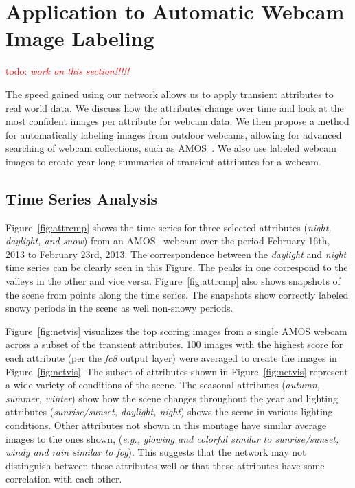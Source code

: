 \documentclass[10pt,twocolumn,letterpaper]{article}
\newcommand{\todo}[1]{\textcolor{red}{todo: {\em #1}}}
\newcommand{\figref}[1]{Figure~\ref{fig:#1}}
\begin{document}
\section{Application to Automatic Webcam Image Labeling}

\todo{work on this section!!!!!}

The speed gained using our network allows us to apply transient attributes to
real world data.  We discuss how the attributes change over time and look at
the most confident images per attribute for webcam data.  We then propose a
method for automatically labeling images from outdoor webcams, allowing for
advanced searching of webcam collections, such as AMOS~\cite{jacobs07amos}. We
also use labeled webcam images to create year-long summaries of transient
attributes for a webcam.

\subsection{Time Series Analysis}
\figref{attrcmp} shows the time series for three selected attributes
(\textit{night, daylight, and snow}) from an AMOS~\cite{jacobs07amos} webcam
over the period February 16th, 2013 to February 23rd, 2013.  The correspondence
between the \textit{daylight} and \textit{night} time series can be clearly seen
in this Figure.  The peaks in one correspond to the valleys in the other and
vice versa.  \figref{attrcmp} also shows snapshots of the scene from points
along the time series.  The snapshots show correctly labeled snowy periods in
the scene as well non-snowy periods.

\figref{netvis} visualizes the top scoring images from a single
AMOS webcam across a subset of the transient attributes.
100 images with the highest score for each attribute (per the \textit{fc8}
output layer) were averaged to create the images in \figref{netvis}.  The
subset of attributes shown in \figref{netvis} represent a wide variety of
conditions of the scene.  The seasonal attributes (\textit{autumn, summer,
winter}) show how the scene changes throughout the year and lighting attributes
(\textit{sunrise/sunset, daylight, night}) shows the scene in various lighting
conditions.  Other attributes not shown in this montage have similar average
images to the ones shown, (\textit{e.g., glowing and colorful similar to
sunrise/sunset, windy and rain similar to fog}).  This suggests that the
network may not distinguish between these attributes well or that these
attributes have some correlation with each other.
\end{document}
